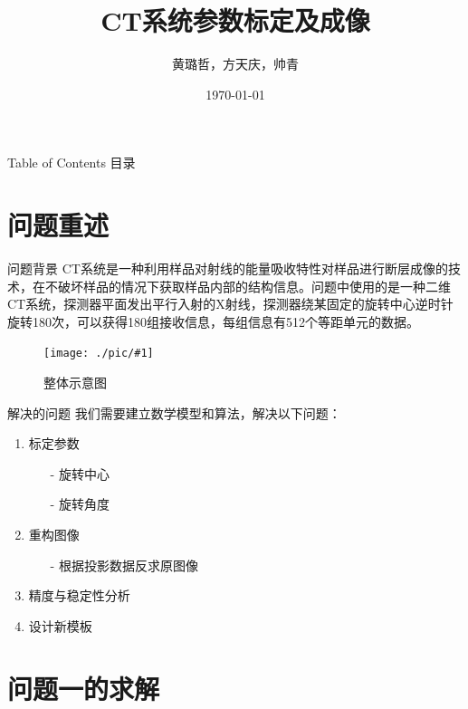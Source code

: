 \documentclass{beamer}
\newcommand{\midpic}[2]{  \begin{figure}[H]
\centering
\texttt{[image: ./pic/\#1]}\\
\caption{#2}
\end{figure}}
\begin{document}
 

\title{CT系统参数标定及成像}
\author{黄璐哲，方天庆，帅青}
\date{\today}

\begin{frame}[plain,t]
	\titlepage
\end{frame} 

\begin{frame}{Table of Contents 目录}
	\tableofcontents
\end{frame} 

\section{问题重述}
\begin{frame}{问题背景}
	\small CT系统是一种利用样品对射线的能量吸收特性对样品进行断层成像的技术，在不破坏样品的情况下获取样品内部的结构信息。问题中使用的是一种二维CT系统，探测器平面发出平行入射的X射线，探测器绕某固定的旋转中心逆时针旋转180次，可以获得180组接收信息，每组信息有512个等距单元的数据。
	\midpic{Overall_Sketch.png}{整体示意图}
\end{frame} %


\begin{frame}{解决的问题}
	我们需要建立数学模型和算法，解决以下问题：
	\begin{enumerate}		  
		\item 标定参数
			\begin{enumerate}
				\item[-] 旋转中心
				\item[-] 旋转角度
			\end{enumerate}
		\item 重构图像
			\begin{enumerate}
				\item[-] 根据投影数据反求原图像
			\end{enumerate}
		\item 精度与稳定性分析
		\item 设计新模板
	\end{enumerate}
\end{frame} %



\section{问题一的求解}
\end{document}
